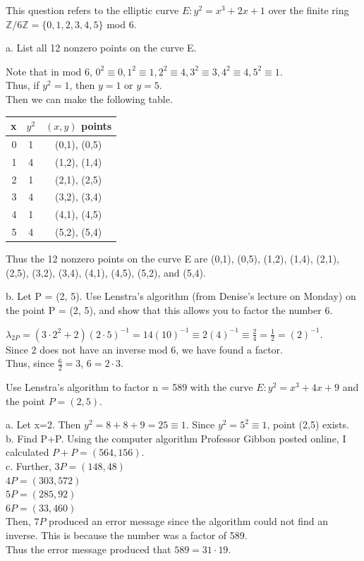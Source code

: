 \begin{problem}
\begin{problem}
\begin{problem}
\begin{problem}
\end{problem}
\begin{problem} 
This question refers to the elliptic curve $E : y^2 = x^3 + 2x + 1$ over the finite ring
$\mathbb{Z}/6\mathbb{Z} = \{0, 1, 2, 3, 4, 5\}$ mod 6.

\solution
a. List all 12 nonzero points on the curve E.

Note that in mod 6, $0^2\equiv0, 1^2\equiv1,2^2\equiv4, 3^2\equiv3, 4^2\equiv4,5^2\equiv1$.\\
Thus, if $y^2=1$, then $y=1$ or $y=5$.\\
Then we can make the following table.

\begin{tabular}{r|c|c}
x & $y^2$ & $(x,y)$ points\\
\hline
0 & 1 & (0,1), (0,5)\\
1 & 4 & (1,2), (1,4)\\
2 & 1 & (2,1), (2,5)\\
3 & 4 & (3,2), (3,4)\\
4 & 1 & (4,1), (4,5)\\
5 & 4 & (5,2), (5,4)\\
\end{tabular}

Thus the 12 nonzero points on the curve E are (0,1), (0,5), (1,2), (1,4), (2,1), (2,5), (3,2), (3,4), (4,1), (4,5), (5,2), and (5,4).

b. Let P = (2, 5). Use Lenstra’s algorithm (from Denise’s lecture on Monday) on the point P = (2, 5), and show that
this allows you to factor the number 6. 

$\lambda_{2P} = (3 \cdot 2^2 + 2)(2 \cdot 5)^{-1} = 14(10)^{-1} \equiv 2(4)^{-1} \equiv \frac{2}{4} = \frac{1}{2} = (2)^{-1}$.\\
Since 2 does not have an inverse mod 6, we have found a factor.\\
Thus, since $\frac{6}{2}=3$, $6=2\cdot3$.

\end{problem}
\begin{problem}
Use Lenstra’s algorithm to factor n = 589 with the curve $E : y^2 = x^3 + 4x + 9$ and the point $P = (2, 5)$.

\solution
a. Let x=2. Then $y^2 = 8+8+9=25 \equiv 1$. Since $y^2 = 5^2 \equiv 1$, point (2,5) exists.\\
b. Find P+P. Using the computer algorithm Professor Gibbon posted online, I calculated $P+P=(564,156)$.\\
c. Further, 
    $3P = (148,48)$\\
    $4P = (303,572)$\\
    $5P = (285,92)$\\
    $6P = (33,460)$\\
    Then, $7P$ produced an error message since the algorithm could not find an inverse.
    This is because the number was a factor of 589.\\
    Thus the error message produced that $589 = 31 \cdot 19$.
\end{problem}